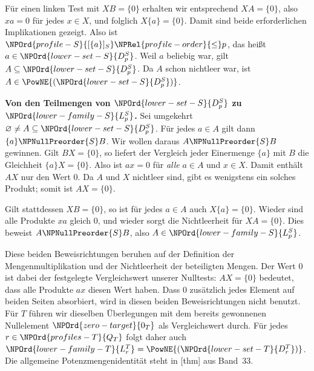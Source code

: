 Für einen linken Test mit \(XB=\{0\}\) erhalten wir entsprechend
\(XA=\{0\}\), also \(xa=0\) für jedes \(x\in X\), und folglich
\(X\{a\}=\{0\}\). Damit sind beide erforderlichen Implikationen
gezeigt. Also ist \(\NPOrd{profile-S}{[\{a\}]_S}\NPRel{profile-order}{\le} p\), das heißt \(a\in \NPOrd{lower-set-S}{D_p^S}\).
Weil \(a\) beliebig war, gilt \(A\subseteq \NPOrd{lower-set-S}{D_p^S}\). Da \(A\) schon
nichtleer war, ist \(A\in\PowNE{(\NPOrd{lower-set-S}{D_p^S})}\).

\medskip\noindent\textbf{Von den Teilmengen von \(\NPOrd{lower-set-S}{D_p^S}\) zu \(\NPOrd{lower-family-S}{L_p^S}\).}
Sei umgekehrt \(\varnothing\ne A\subseteq \NPOrd{lower-set-S}{D_p^S}\).
Für jedes \(a\in A\) gilt dann \(\{a\}\NPNullPreorder{S} B\).
Wir wollen daraus \(A\NPNullPreorder{S} B\) gewinnen. Gilt \(BX=\{0\}\),
so liefert der Vergleich jeder Einermenge \(\{a\}\) mit \(B\)
die Gleichheit \(\{a\}X=\{0\}\). Also ist \(ax=0\) für
\emph{alle} \(a\in A\) und \(x\in X\). Damit enthält \(AX\) nur
den Wert \(0\). Da \(A\) und \(X\) nichtleer sind, gibt es wenigstens
ein solches Produkt; somit ist \(AX=\{0\}\).

Gilt stattdessen \(XB=\{0\}\), so ist für jedes \(a\in A\)
auch \(X\{a\}=\{0\}\). Wieder sind alle Produkte \(xa\) gleich \(0\),
und wieder sorgt die Nichtleerheit für \(XA=\{0\}\).
Dies beweist \(A\NPNullPreorder{S} B\), also \(A\in \NPOrd{lower-family-S}{L_p^S}\).

Diese beiden Beweisrichtungen beruhen auf der Definition der
Mengenmultiplikation und der Nichtleerheit der beteiligten Mengen.
Der Wert \(0\) ist dabei der festgelegte Vergleichswert unserer
Nulltests: \(AX=\{0\}\) bedeutet, dass alle Produkte \(ax\) diesen
Wert haben. Dass \(0\) zusätzlich jedes Element auf beiden Seiten
absorbiert, wird in diesen beiden Beweisrichtungen nicht benutzt.
Für \(T\) führen wir dieselben Überlegungen mit dem bereits
gewonnenen Nullelement \(\NPOrd{zero-target}{0_T}\) als Vergleichswert durch.
Für jedes \(r\in \NPOrd{profiles-T}{Q_T}\) folgt daher auch
\(\NPOrd{lower-family-T}{L_r^T}=\PowNE{(\NPOrd{lower-set-T}{D_r^T})}\). Die allgemeine Potenzmengenidentität
steht in [thm] aus Band~33.

